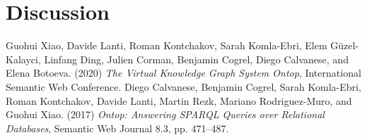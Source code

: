 \documentclass{article}
\begin{document}
\section{Discussion}



\begin{thebibliography}{99}
Guohui Xiao, Davide Lanti, Roman Kontchakov, Sarah Komla-Ebri, Elem Güzel-Kalayci, Linfang Ding, Julien Corman, Benjamin Cogrel, Diego Calvanese, and Elena Botoeva. (2020) \emph{The Virtual Knowledge Graph System Ontop}, International Semantic Web Conference.
Diego Calvanese, Benjamin Cogrel, Sarah Komla-Ebri, Roman Kontchakov, Davide Lanti, Martin Rezk, Mariano Rodriguez-Muro, and Guohui Xiao. (2017) \emph{Ontop: Answering SPARQL Queries over Relational Databases}, Semantic Web Journal 8.3, pp. 471–487.
\end{thebibliography}
\end{document}
